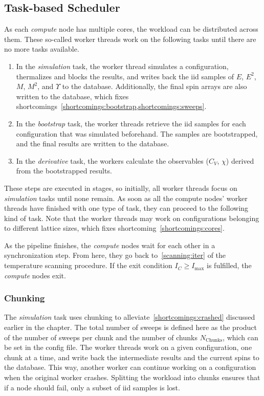 \subsection{Task-based Scheduler}\label{sec:impl:tasks}
	As each \emph{compute} node has multiple cores, the workload can be distributed across them. These so-called worker threads work on the following tasks until there are no more tasks available.
	\begin{enumerate}
		\item In the \emph{simulation} task, the worker thread simulates a configuration, thermalizes and blocks the results, and writes back the iid samples of $E$, $E^2$, $M$, $M^2$, and $\Upsilon$ to the database. Additionally, the final spin arrays are also written to the database, which fixes shortcomings~\cref{shortcomings:bootstrap,shortcomings:sweeps}.
		\item In the \emph{bootstrap} task, the worker threads retrieve the iid samples for each configuration that was simulated beforehand. The samples are bootstrapped, and the final results are written to the database.
		\item In the \emph{derivative} task, the workers calculate the observables ($C_V$, $\chi$) derived from the bootstrapped results.
	\end{enumerate}
	These steps are executed in stages, so initially, all worker threads focus on \emph{simulation} tasks until none remain. As soon as all the compute nodes' worker threads have finished with one type of task, they can proceed to the following kind of task. Note that the worker threads may work on configurations belonging to different lattice sizes, which fixes shortcoming~\cref{shortcomings:cores}.
	
	As the pipeline finishes, the \emph{compute} nodes wait for each other in a synchronization step. From here, they go back to~\cref{scanning:iter} of the temperature scanning procedure. If the exit condition $I_C \ge I_\text{max}$ is fulfilled, the \emph{compute} nodes exit.

	\subsubsection{Chunking}\label{sec:impl:tasks:chunks}
		The \emph{simulation} task uses chunking to alleviate~\cref{shortcomings:crashed} discussed earlier in the chapter. The total number of sweeps is defined here as the product of the number of sweeps per chunk and the number of chunks $N_\text{Chunks}$, which can be set in the config file. The worker threads work on a given configuration, one chunk at a time, and write back the intermediate results and the current spins to the database. This way, another worker can continue working on a configuration when the original worker crashes. Splitting the workload into chunks ensures that if a node should fail, only a subset of iid samples is lost.

